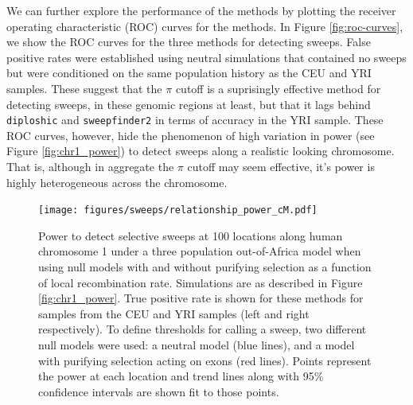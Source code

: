 \documentclass[hidelinks]{article}
\newcommand{\stdpopsim}{\texttt{stdpopsim}\xspace}
\newcommand{\sweepfinder}{\texttt{sweepfinder2}\xspace}
\newcommand{\diploshic}{\texttt{diploshic}\xspace}
\begin{document}
    We can further explore the performance of the methods by plotting the receiver operating characteristic (ROC) curves for the methods.
    In Figure \ref{fig:roc-curves}, we show the ROC curves for the three methods for detecting sweeps.
    False positive rates were established using neutral simulations that contained no sweeps
    but were conditioned on the same population history as the CEU and YRI samples.
    These suggest that the $\pi$ cutoff is a suprisingly effective method for detecting sweeps,
    in these genomic regions at least, but that it lags behind \diploshic and \sweepfinder in terms of accuracy in the YRI sample.
    These ROC curves, however, hide the phenomenon of high variation in power (see Figure \ref{fig:chr1_power}) to detect sweeps along a realistic looking chromosome.
    That is, although in aggregate the $\pi$ cutoff may seem effective, it's power is highly heterogeneous across the chromosome.


    \begin{figure}
        \centering
        \texttt{[image: figures/sweeps/relationship\_power\_cM.pdf]}
        \caption{
        Power to detect selective sweeps at 100 locations along human
        chromosome 1 under a three population out-of-Africa model
        \citep{gutenkunst2009inferring}  when using null models with and
        without purifying selection as a function of local recombination rate.
        Simulations are as described in Figure \ref{fig:chr1_power}.  True
        positive rate is shown for these methods for samples from the CEU and
        YRI samples (left and right respectively).  To define thresholds for
        calling a sweep, two different null models were used: a neutral model
        (blue lines), and a model with purifying selection acting on exons (red
        lines).  Points represent the power at each location and trend lines
        along with 95\% confidence intervals are shown fit to those points.
        }
        \label{fig:power-recomb}
    \end{figure}
\end{document}
